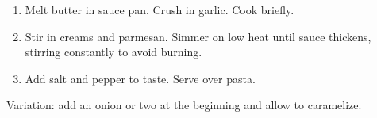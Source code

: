 
\begin{ingredients}
\end{ingredients}


\begin{recipe}
  \begin{enumerate}

  \item Melt butter in sauce pan.  Crush in garlic.  Cook briefly.

  \item Stir in creams and parmesan. Simmer on low heat until sauce
    thickens, stirring constantly to avoid burning.

  \item Add salt and pepper to taste.  Serve over pasta.

  \end{enumerate}
\end{recipe}

Variation: add an onion or two at the beginning and allow to caramelize.

